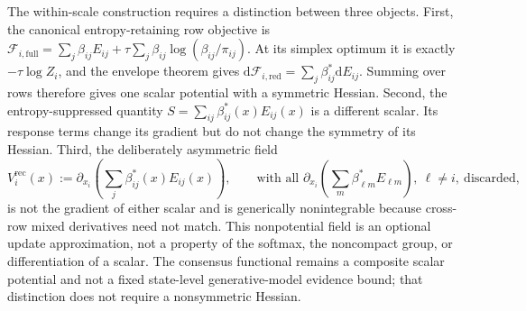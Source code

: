 \documentclass[11pt]{article}
\begin{document}
The within-scale construction requires a distinction between three objects. First, the canonical entropy-retaining row objective is $\mathcal{F}_{i,\mathrm{full}}=\sum_j\beta_{ij}E_{ij}+\tau\sum_j\beta_{ij}\log(\beta_{ij}/\pi_{ij})$. At its simplex optimum it is exactly $-\tau\log Z_i$, and the envelope theorem gives $\mathrm{d}\mathcal{F}_{i,\mathrm{red}}=\sum_j\beta_{ij}^*\mathrm{d}E_{ij}$. Summing over rows therefore gives one scalar potential with a symmetric Hessian. Second, the entropy-suppressed quantity $S=\sum_{ij}\beta_{ij}^*(x)E_{ij}(x)$ is a different scalar. Its response terms change its gradient but do not change the symmetry of its Hessian. Third, the deliberately asymmetric field
\begin{equation}
V_i^{\mathrm{rec}}(x):=\partial_{x_i}\left(\sum_j\beta_{ij}^*(x)E_{ij}(x)\right),
\qquad
\text{with all }\partial_{x_i}\left(\sum_m\beta_{\ell m}^*E_{\ell m}\right),\ \ell\ne i,\ \text{discarded},
\label{eq:receiver_only_field}
\end{equation}
is not the gradient of either scalar and is generically nonintegrable because cross-row mixed derivatives need not match. This nonpotential field is an optional update approximation, not a property of the softmax, the noncompact group, or differentiation of a scalar. The consensus functional remains a composite scalar potential and not a fixed state-level generative-model evidence bound; that distinction does not require a nonsymmetric Hessian.
\end{document}
